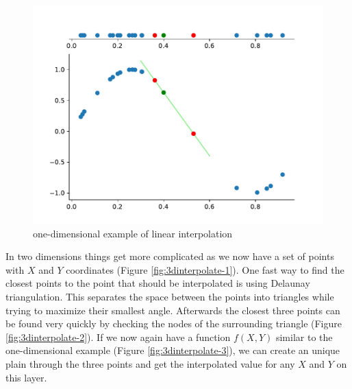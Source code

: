 \begin{figure}[h] %
	\centering
	\includegraphics[width=0.8\linewidth]{images/vis1d.pdf}
	\caption{one-dimensional example of linear interpolation}
	\label{fig:one-dim-interpolation}
\end{figure}

In two dimensions things get more complicated as we now have a set of points with $X$ and $Y$ coordinates (Figure \ref{fig:3dinterpolate-1}). One fast way to find the closest points to the point that should be interpolated is using Delaunay triangulation. This separates the space between the points into triangles while trying to maximize their smallest angle. Afterwards the closest three points can be found very quickly by checking the nodes of the surrounding triangle  (Figure \ref{fig:3dinterpolate-2}). If we now again have a function $f(X,Y)$ similar to the one-dimensional example (Figure \ref{fig:3dinterpolate-3}), we can create an unique plain through the three points and get the interpolated value for any $X$ and $Y$ on this layer.


